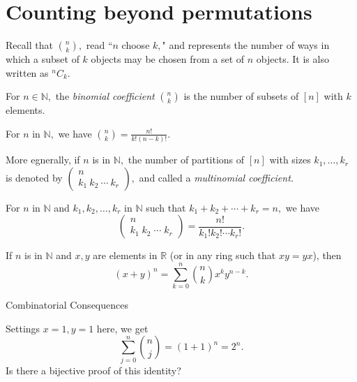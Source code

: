 \section{Counting beyond permutations}

Recall that $\binom{n}{k},$ read ``$n$ choose $k,$"
and represents the number of ways in which a subset of $k$ objects 
may be chosen from a set of $n$ objects. It is also written as ${}^nC_k.$

\begin{definition}[$\binom{n}{k}$]
	For $n \in \mathbb{N},$ the \emph{binomial coefficient} $\binom{n}{k}$
	is the number of subsets of $[n]$ with $k$ elements.
\end{definition}

\begin{proposition}
	For $n$ in $\mathbb{N},$ we have $\binom{n}{k} =  \frac{n!}{k! (n-k)!}.$	
\end{proposition}


More egnerally, if $n$ is in $\mathbb{N},$ the number of partitions of $[n]$
with sizes $k_1, \dotsc, k_r$ is denoted by
$\begin{pmatrix} n \\ k_1 \: k_2\: \cdots \: k_r \end{pmatrix},$
and called a \emph{multinomial coefficient.}

\begin{theorem}
	For $n$ in $\mathbb{N}$ and $k_1, k_2, \dotsc, k_r$ in $\mathbb{N}$ such that
	$k_1 + k_ 2 + \cdots + k_r = n,$ we have 
	$$ \begin{pmatrix} n \\ k_1 \; k_ 2 \; \cdots \; k_r \end{pmatrix}
	= \frac{n!}{k_1 ! k_2 ! \cdots k_r!}. $$
\end{theorem}

\begin{theorem}
	If $n$ is in $\mathbb{N}$ and $x, y $ are elements in $\mathbb{R}$ (or in any ring 
	such that $xy = yx$), then 
	$$ (x+y)^n = \sum_{k=0}^{n} \binom{n}{k} x^k y^{n-k} .$$
\end{theorem}
Combinatorial Consequences


Settings $x=1, y=  1$ here, we get
$$
\sum_{j=0}^{n} \binom{n}{j} = (1+1)^n = 2^n.$$
Is there a bijective proof of this identity?

